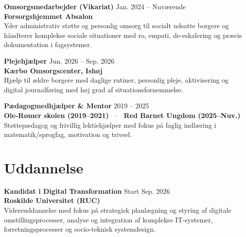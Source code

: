 \documentclass[9.5pt,a4paper]{article}
\begin{document}
\vspace{3pt}

\textbf{\fontsize{9.5}{12}\selectfont Omsorgsmedarbejder (Vikariat)} \hfill {\fontsize{8.5}{11}\selectfont\color{mutedgray}Jan. 2024 -- Nuværende} \\
{\fontsize{8.5}{11}\selectfont\textbf{\color{accent}Forsorgshjemmet Absalon}} \\[2pt]
{\fontsize{8.5}{11}\selectfont\color{darkslate}
Yder administrativ støtte og personlig omsorg til socialt udsatte borgere og håndterer komplekse sociale situationer med ro, empati, de-eskalering og præcis dokumentation i fagsystemer.
}

\vspace{3pt}

\textbf{\fontsize{9.5}{12}\selectfont Plejehjælper} \hfill {\fontsize{8.5}{11}\selectfont\color{mutedgray}Jun. 2026 -- Sep. 2026} \\
{\fontsize{8.5}{11}\selectfont\textbf{\color{accent}Kærbo Omsorgscenter, Ishøj}} \\[2pt]
{\fontsize{8.5}{11}\selectfont\color{darkslate}
Hjælp til ældre borgere med daglige rutiner, personlig pleje, aktivisering og digital journalføring med høj grad af situationsfornemmelse.
}

\vspace{3pt}

\textbf{\fontsize{9.5}{12}\selectfont Pædagogmedhjælper \& Mentor} \hfill {\fontsize{8.5}{11}\selectfont\color{mutedgray}2019 -- 2025} \\
{\fontsize{8.5}{11}\selectfont\textbf{\color{accent}Ole-Rømer skolen (2019--2021) \ $\cdot$ \ Red Barnet Ungdom (2025--Nuv.)}} \\[2pt]
{\fontsize{8.5}{11}\selectfont\color{darkslate}
Støttepædagog og frivillig lektiehjælper med fokus på faglig indlæring i matematik/sprogfag, motivation og trivsel.
}

\section{Uddannelse}

\textbf{\fontsize{9.5}{12}\selectfont Kandidat i Digital Transformation} \hfill {\fontsize{8.5}{11}\selectfont\color{mutedgray}Start Sep. 2026} \\
{\fontsize{8.5}{11}\selectfont\textbf{\color{accent}Roskilde Universitet (RUC)}} \\[2pt]
{\fontsize{8.5}{11}\selectfont\color{darkslate}
Videreuddannelse med fokus på strategisk planlægning og styring af digitale omstillingsprocesser, analyse og integration af komplekse IT-systemer, forretningsprocesser og socio-teknisk systemdesign.
}
\end{document}
